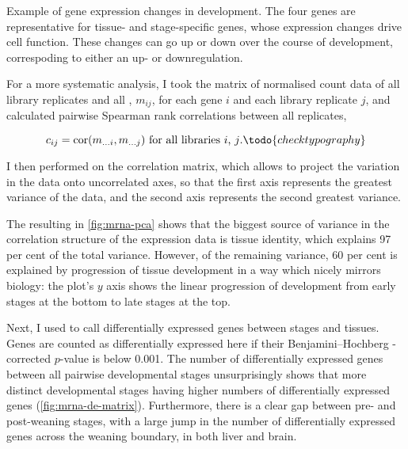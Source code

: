     {Example of gene expression changes in development.}
    {The four genes are representative for tissue- and stage-specific genes,
    whose expression changes drive cell function. These changes can go up or
    down over the course of development, correspoding to either an up- or
    downregulation.}

For a more systematic analysis, I took the matrix of normalised count data of
all library replicates and all \mrna[s], \(m_{ij}\), for each \mrna gene \(i\)
and each library replicate \(j\), and calculated pairwise Spearman rank
correlations between all replicates,

\begin{equation}
    c_{ij} = \operatorname{cor}(m_{\dots i}, m_{\dots j}) \text{\ for all
        libraries \(i\), \(j\).}\todo{check typography}
\end{equation}

I then performed \pca on the correlation matrix, which allows to project the
variation in the data onto uncorrelated axes, so that the first axis represents
the greatest variance of the data, and the second axis represents the second
greatest variance.

The resulting \pca in \cref{fig:mrna-pca} shows that the biggest source of
variance in the correlation structure of the expression data is tissue identity,
which explains \num{97} per cent of the total variance. However, of the
remaining variance, \num{60} per cent is explained by progression of tissue
development in a way which nicely mirrors biology: the plot’s \(y\) axis shows
the linear progression of development from early stages at the bottom to late
stages at the top.

Next, I used  \citep{Love:2014} to call differentially expressed
genes between stages and tissues. Genes are counted as differentially expressed
here if their Benjamini–Hochberg \fdr-corrected \(p\)-value is below
\num{0.001}. The number of differentially expressed genes between all pairwise
developmental stages unsurprisingly shows that more distinct developmental
stages having higher numbers of differentially expressed genes
(\cref{fig:mrna-de-matrix}). Furthermore, there is a clear gap between pre- and
post-weaning stages, with a large jump in the number of differentially expressed
genes across the weaning boundary, in both liver and brain.

